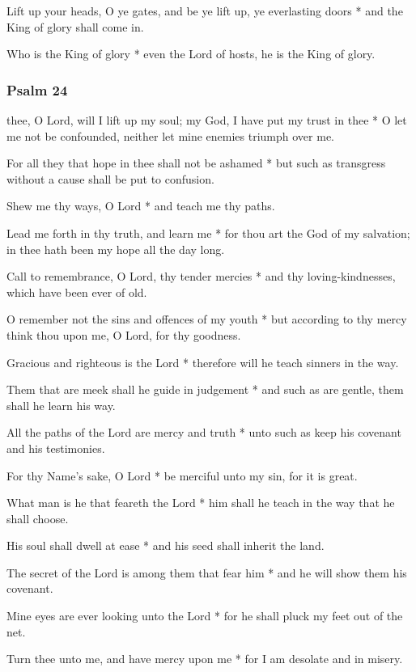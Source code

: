Lift up your heads, O ye gates, and be ye lift up, ye everlasting doors * and the King of glory shall come in.

Who is the King of glory * even the Lord of hosts, he is the King of glory.



\subsubsection{Psalm 24}


 thee, O Lord, will I lift up my soul; my God, I have put my trust in thee * O let me not be confounded, neither let mine enemies triumph over me.

For all they that hope in thee shall not be ashamed * but such as transgress without a cause shall be put to confusion.

Shew me thy ways, O Lord * and teach me thy paths.

Lead me forth in thy truth, and learn me * for thou art the God of my salvation; in thee hath been my hope all the day long.

Call to remembrance, O Lord, thy tender mercies * and thy loving-kindnesses, which have been ever of old.

O remember not the sins and offences of my youth * but according to thy mercy think thou upon me, O Lord, for thy goodness.

Gracious and righteous is the Lord * therefore will he teach sinners in the way.

Them that are meek shall he guide in judgement * and such as are gentle, them shall he learn his way.

All the paths of the Lord are mercy and truth * unto such as keep his covenant and his testimonies.

For thy Name's sake, O Lord * be merciful unto my sin, for it is great.

What man is he that feareth the Lord * him shall he teach in the way that he shall choose.

His soul shall dwell at ease * and his seed shall inherit the land.

The secret of the Lord is among them that fear him * and he will show them his covenant.

Mine eyes are ever looking unto the Lord * for he shall pluck my feet out of the net.

Turn thee unto me, and have mercy upon me * for I am desolate and in misery.


